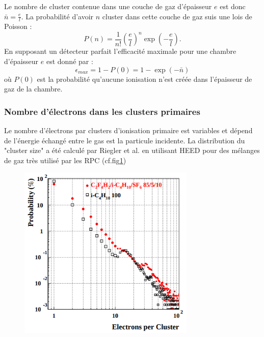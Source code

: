 Le nombre  de cluster contenue dans une couche de gaz d'épaisseur $e$ est donc $\bar{n}=\frac{e}{l}$. La probabilité d'avoir $n$ cluster dans cette couche de gaz suis une lois de Poisson :
\begin{equation}
P(n)=\frac{1}{n!}\left(\frac{e}{l}\right)^{n}\exp\left(-\frac{e}{l}\right).
\end{equation}
En supposant un détecteur parfait l'efficacité maximale pour une chambre d'épaisseur $e$ est donné par :
\begin{equation}
\epsilon_{max}=1-P(0)=1-\exp\left(-\bar{n}\right)
\end{equation}
où $P(0)$ est la probabilité qu'aucune ionisation n'est créée dans l'épaisseur de gaz de la chambre.

\subsubsection*{Nombre d'électrons dans les clusters primaires}
Le nombre d'électrons par clusters d'ionisation primaire est variables et dépend de l'énergie échangé entre le gas est la particule incidente. La distribution du "cluster size" a été calculé par Riegler et al. \cite{Riegler:570462} en utilisant HEED pour des mélanges de gaz très utilisé par les RPC (cf.fig\ref{cluster})
\begin{figure}[h!]
	\centering
	\includegraphics[width=0.75\textwidth]{RPC/cluster.png}
	\label{cluster}
\end{figure}

